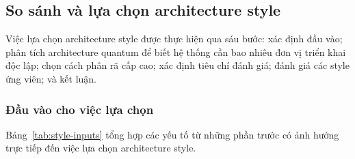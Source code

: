 \subsection{So sánh và lựa chọn architecture style}\label{sec:style-selection}
Việc lựa chọn architecture style được thực hiện qua sáu bước: xác định đầu vào; phân tích architecture quantum để biết hệ thống cần bao nhiêu đơn vị triển khai độc lập; chọn cách phân rã cấp cao; xác định tiêu chí đánh giá; đánh giá các style ứng viên; và kết luận.

\subsubsection{Đầu vào cho việc lựa chọn}\label{sec:style-inputs}
Bảng~\ref{tab:style-inputs} tổng hợp các yếu tố từ những phần trước có ảnh hưởng trực tiếp đến việc lựa chọn architecture style.

